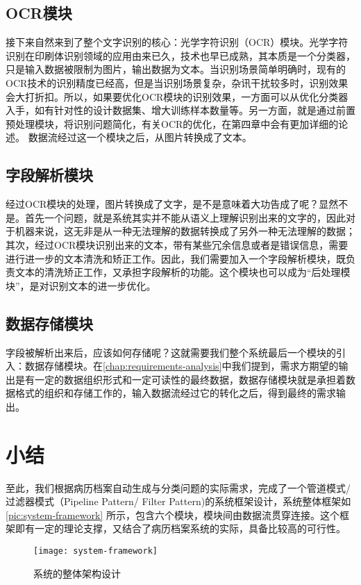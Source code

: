 \subsection{OCR模块}
接下来自然来到了整个文字识别的核心：光学字符识别（OCR）模块。光学字符识别在印刷体识别领域的应用由来已久\citep{impedovo1991optical}，技术也早已成熟，其本质是一个分类器，只是输入数据被限制为图片，输出数据为文本。当识别场景简单明确时，现有的OCR技术的识别精度已经高，但是当识别场景复杂，杂讯干扰较多时，识别效果会大打折扣。所以，如果要优化OCR模块的识别效果，一方面可以从优化分类器入手，如有针对性的设计数据集、增大训练样本数量等。另一方面，就是通过前置预处理模块，将识别问题简化，有关OCR的优化，在第四章中会有更加详细的论述。
数据流经过这一个模块之后，从图片转换成了文本。

\subsection{字段解析模块}
经过OCR模块的处理，图片转换成了文字，是不是意味着大功告成了呢？显然不是。首先一个问题，就是系统其实并不能从语义上理解识别出来的文字的，因此对于机器来说，这无非是从一种无法理解的数据转换成了另外一种无法理解的数据；其次，经过OCR模块识别出来的文本，带有某些冗余信息或者是错误信息，需要进行进一步的文本清洗和矫正工作。因此，我们需要加入一个字段解析模块，既负责文本的清洗矫正工作，又承担字段解析的功能。这个模块也可以成为“后处理模块”，是对识别文本的进一步优化。

\subsection{数据存储模块}
字段被解析出来后，应该如何存储呢？这就需要我们整个系统最后一个模块的引入：数据存储模块。在\autoref{chap:requirements-analysis}中我们提到，需求方期望的输出是有一定的数据组织形式和一定可读性的最终数据，数据存储模块就是承担着数据格式的组织和存储工作的，输入数据流经过它的转化之后，得到最终的需求输出。

\section{小结}
至此，我们根据病历档案自动生成与分类问题的实际需求，完成了一个管道模式/过滤器模式（Pipeline Pattern/ Filter Pattern)的系统框架设计，系统整体框架如\autoref{pic:system-framework}
所示，包含六个模块，模块间由数据流贯穿连接。这个框架即有一定的理论支撑，又结合了病历档案系统的实际，具备比较高的可行性。
\begin{figure}
	\centering
	\texttt{[image: system-framework]}
	\caption{系统的整体架构设计}
	\label{pic:system-framework}
\end{figure}
